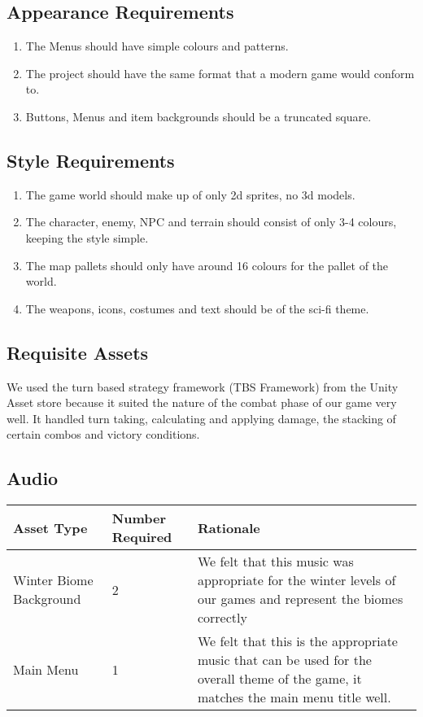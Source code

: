 \documentclass{article}
\begin{document}
\subsection{Appearance Requirements}
\begin{enumerate}[{APPR}1. ]
	\item The Menus should have simple colours and patterns.
	\item The project should have the same format that a modern game would conform to.
	\item Buttons, Menus and item backgrounds should be a truncated square. 
\end{enumerate}
\subsection{Style Requirements}
\begin{enumerate}[{SR}1. ]
	\item The game world should make up of only 2d sprites, no 3d models.
	\item The character, enemy, NPC and terrain should consist of only 3-4 colours, keeping the style simple.
	\item The map pallets should only have around 16 colours for the pallet of the world.
	\item The weapons, icons, costumes and text should be of the sci-fi theme.
\end{enumerate}
\subsection{Requisite Assets}
\quad We used the turn based strategy framework (TBS Framework) from the Unity Asset store because it suited the nature of the combat phase of our game very well. It handled turn taking, calculating and applying damage, the stacking of certain combos and victory conditions.
\subsection{Audio}
\begin{center}
\begin{tabular}{ | m{5cm} | m{5cm}|m{5cm}|} 
\hline
Asset Type & Number Required & Rationale\\ 
\hline
Winter Biome Background & 2 & We felt that this music was appropriate for the winter levels of our games and represent the biomes correctly\\
\hline
Main Menu & 1 & We felt that this is the appropriate music that can be used for the overall theme of the game, it matches the main menu title well.\\
\hline
\end{tabular}
\end{center}
\end{document}
